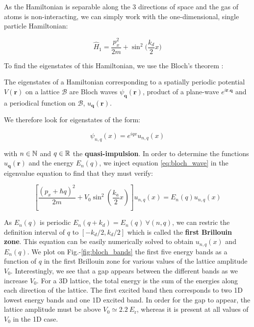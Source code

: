 \noindent As the Hamiltonian is separable along the 3 directions of space and the gas of atoms is non-interacting, we can simply work with the one-dimensional, single particle Hamiltonian:

\begin{equation}
    \hat{H}_1 = \frac{p_x^2}{2m} + \sin^2 \Big(\frac{k_d}{2} x \Big)
\end{equation}

\noindent To find the eigenstates of this Hamiltonian, we use the Bloch's theorem \cite{ashcroft1976solid}:

\begin{tcolorbox}[colback=red!5!white,colframe=red!75!black,title=\textbf{Bloch's theorem}]
\label{sec:bloch}
The eigenstates of a Hamiltonian corresponding to a spatially periodic potential $V(\bm{r})$ on a lattice $\mathcal{B}$ are Bloch waves $\psi_{\bm{q}}(\bm{r})$, product of a plane-wave $e^{i \bm{r}.\bm{q}}$ and a periodical function on $\mathcal{B}$, $u_{\bm{q}} (\bm{r})$.
\end{tcolorbox}

We therefore look for eigenstates of the form:

\begin{equation}
    \psi_{n,q} (x)= e^{iqx} u_{n,q} (x)
    \label{eq:bloch_wave}
\end{equation}

\noindent with $n \in \mathbb{N}$ and $q \in \mathbb{R}$ the \textbf{quasi-impulsion}. In order to determine the functions $u_{\bm{q}} (\bm{r})$ and the energy $E_n (q)$, we inject equation \ref{eq:bloch_wave} in the eigenvalue equation to find that they must verify:

\begin{equation}
    \left[\frac{\left(p_{x}+\hbar q\right)^{2}}{2 m}+V_{0} \sin ^{2}\left(\frac{k_{a}}{2} x\right)\right] u_{n, q}(x)=E_{n}(q) u_{n, q}(x)
\end{equation}

\noindent As $E_n (q)$ is periodic $E_n (q+k_d)= E_n(q) \ \forall (n,q)$, we can restric the definition interval of $q$ to $[-k_d/2, k_d/2]$ which is called the \textbf{first Brillouin zone}. This equation can be easily numerically solved to obtain $u_{n, q}(x)$ and $E_n (q)$. We plot on Fig.-\ref{fig:bloch_bands} the first five energy bands as a function of $q$ in the first Brillouin zone for various values of the lattice amplitude $V_0$. Interestingly, we see that a gap appears between the different bands as we increase $V_0$. For a 3D lattice, the total energy is the sum of the energies along each direction of the lattice. The first excited band then corresponds to two 1D lowest energy bands and one 1D excited band. In order for the gap to appear, the lattice amplitude must be above $V_0 \simeq 2.2 \ E_{\mathrm{r}}$, whereas it is present at all values of $V_0$ in the 1D case.

